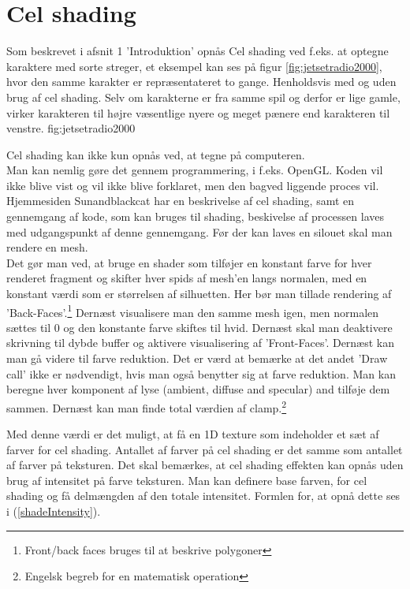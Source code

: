 \newpage
\section{Cel shading}
Som beskrevet i afsnit 1 'Introduktion' opnås Cel shading ved f.eks. at optegne karaktere med sorte streger, et eksempel kan ses på figur \ref{fig:jetsetradio2000}, hvor den samme karakter er repræsentateret to gange. Henholdsvis med og uden brug af cel shading. Selv om karakterne er fra samme spil og derfor er lige gamle, virker karakteren til højre væsentlige nyere og meget pænere end karakteren til venstre. 
 {} {fig:jetsetradio2000}

Cel shading kan ikke kun opnås ved, at tegne på computeren.\\ Man kan nemlig gøre det gennem programmering, i f.eks. OpenGL. 
Koden vil ikke blive vist og vil ikke blive forklaret, men den bagved liggende proces vil. Hjemmesiden Sunandblackcat \cite{sunandblackcat2016} har en beskrivelse af cel shading, samt en gennemgang af kode, som kan bruges til shading, beskivelse af processen laves med udgangspunkt af denne gennemgang. Før der kan laves en silouet skal man rendere en mesh. \\
Det gør man ved, at bruge en shader som tilføjer en konstant farve for
hver renderet fragment og skifter hver spids af mesh’en langs normalen, med en konstant værdi
som er størrelsen af silhuetten. Her bør man tillade rendering af ’Back-Faces’.\footnote[2]
{Front/back faces bruges til at beskrive polygoner}
Dernæst visualisere man den samme mesh igen, men normalen sættes til 0 og den konstante farve
skiftes til hvid.
Dernæst skal man deaktivere skrivning til dybde buffer og aktivere
visualisering af ’Front-Faces’. Dernæst kan man gå videre til farve reduktion. Det er værd at
bemærke at det andet ’Draw call’ ikke er nødvendigt, hvis man også benytter sig at farve
reduktion. 
Man kan beregne hver komponent af lyse (ambient, diffuse and specular) and tilføje dem sammen.
Dernæst kan man finde total værdien af clamp.\footnote[3]{Engelsk begreb for en matematisk
operation}

Med denne værdi er det muligt, at få en 1D texture som indeholder et sæt af farver for cel
shading. Antallet af farver på cel shading er det samme som antallet af farver på teksturen.
Det skal bemærkes, at cel shading effekten kan opnås uden brug af intensitet på farve
teksturen. 
Man kan definere base farven, for cel shading og få delmængden af den totale intensitet. Formlen
for, at opnå dette ses i (\ref{shadeIntensity}).

